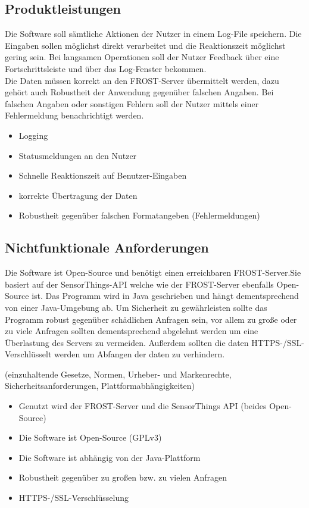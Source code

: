 \documentclass[12 pt]{article}
\begin{document}
\subsection{Produktleistungen}
Die Software soll sämtliche Aktionen der Nutzer in einem Log-File speichern. Die Eingaben sollen möglichst direkt verarbeitet und die Reaktionszeit möglichst gering sein. Bei langsamen Operationen soll der Nutzer Feedback über eine Fortschrittsleiste und über das Log-Fenster bekommen. \\
Die Daten müssen korrekt an den FROST-Server übermittelt werden, dazu gehört auch Robustheit der Anwendung gegenüber falschen Angaben. Bei falschen Angaben oder sonstigen Fehlern soll der Nutzer mittels einer Fehlermeldung benachrichtigt werden.
\begin{itemize}
\item Logging
\item Statusmeldungen an den Nutzer
\item Schnelle Reaktionszeit auf Benutzer-Eingaben
\item korrekte Übertragung der Daten
\item Robustheit gegenüber falschen Formatangeben (Fehlermeldungen)
\end{itemize}

\subsection{Nichtfunktionale Anforderungen}
Die Software ist Open-Source und benötigt einen erreichbaren FROST-Server.Sie basiert auf der SensorThings-API welche wie der FROST-Server ebenfalls Open-Source ist.
Das Programm wird in Java geschrieben und hängt dementsprechend von einer Java-Umgebung ab.
Um Sicherheit zu gewährleisten sollte das Programm robust gegenüber schädlichen Anfragen sein, vor allem zu große oder zu viele Anfragen sollten dementsprechend abgelehnt werden um eine Überlastung des Servers zu vermeiden.
Außerdem sollten die daten HTTPS-/SSL-Verschlüsselt werden um Abfangen der daten zu verhindern.

(einzuhaltende Gesetze, Normen, Urheber- und Markenrechte,
Sicherheitsanforderungen, Plattformabhängigkeiten)
\begin{itemize}
\item Genutzt wird der FROST-Server und die SensorThings API (beides Open-Source)
\item Die Software ist Open-Source (GPLv3)
\item Die Software ist abhängig von der Java-Plattform
\item Robustheit gegenüber zu großen bzw. zu vielen Anfragen 		
\item HTTPS-/SSL-Verschlüsselung								
\end{itemize}
\end{document}
